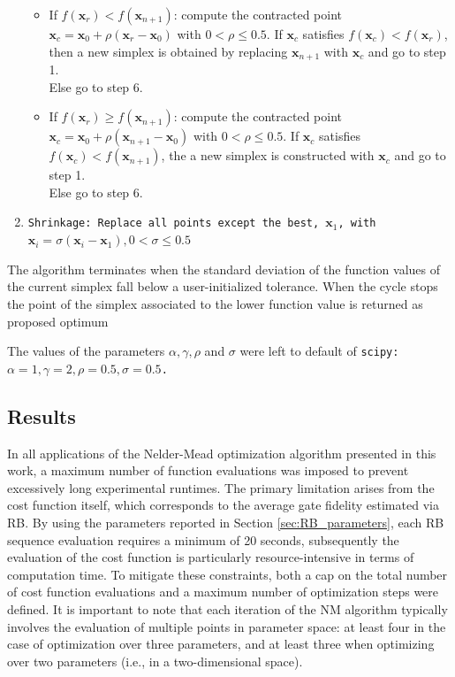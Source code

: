 \begin{enumerate}
\begin{itemize}
        \item If $f(\mathbf{x}_r) < f(\mathbf{x}_{n+1})$: compute the contracted point $\mathbf{x}_c=\mathbf{x}_0 +\rho(\mathbf{x}_{r}-\mathbf{x}_0)$ with $0<\rho \leq 0.5$.
                If $\mathbf{x}_c$ satisfies $f(\mathbf{x}_c) < f(\mathbf{x}_{r})$, then a new simplex is obtained by replacing $\mathbf{x}_{n+1}$ with  $\mathbf{x}_c$ and go to step 1.\\
                Else go to step 6.
        \item  If $f(\mathbf{x}_r) \geq f(\mathbf{x}_{n+1})$: compute the contracted point $\mathbf{x}_c=\mathbf{x}_0 +\rho(\mathbf{x}_{n+1}-\mathbf{x}_0)$ with $0<\rho \leq 0.5$.
                If $\mathbf{x}_c$ satisfies $f(\mathbf{x}_c) < f(\mathbf{x}_{n+1})$, the a new simplex is constructed with $\mathbf{x}_c$ and go to step 1.\\
                Else go to step 6.
    \end{itemize}
    \item \tt{Shrinkage}: Replace all points except the best, $\mathbf{x}_1$, with $\mathbf{x}_i = \sigma(\mathbf{x}_i - \mathbf{x}_1), 0<\sigma \leq 0.5$  
\end{enumerate}
The algorithm terminates when the standard deviation of the function values of the current simplex fall below a user-initialized tolerance. 
When the cycle stops the point of the simplex associated to the lower function value is returned as proposed optimum

The values of the parameters $\alpha, \gamma, \rho$ and $\sigma$ were left to default of \tt{scipy}: $\alpha=1, \gamma=2, \rho=0.5, \sigma=0.5$. 

\subsection{Results}
In all applications of the Nelder-Mead optimization algorithm presented in this work, a maximum number of function evaluations was imposed to prevent excessively long experimental runtimes. 
The primary limitation arises from the cost function itself, which corresponds to the average gate fidelity estimated via RB. 
By using the parameters reported in Section \ref{sec:RB_parameters}, each RB sequence evaluation requires a minimum of 20 seconds, subsequently the evaluation of the cost function is particularly resource-intensive in terms of computation time.
To mitigate these constraints, both a cap on the total number of cost function evaluations and a maximum number of optimization steps were defined. 
It is important to note that each iteration of the NM algorithm typically involves the evaluation of multiple points in parameter space: at least four in the case of optimization over three parameters, and at least three when optimizing over two parameters (i.e., in a two-dimensional space).

